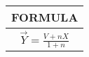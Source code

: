 \begin{tabular}[4pt]{|c|}
    \hline 
    \textbf{FORMULA}\\
    \hline
   $\vec{Y} = \frac{V +nX}{1+n}$ \\
    \hline
    
\end{tabular}
